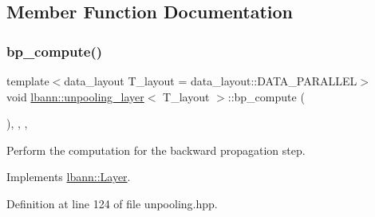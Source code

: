 \subsection{Member Function Documentation}
\mbox{\label{classlbann_1_1unpooling__layer_ad585e8ddaa34c221fa8e4d108c8950ae}} 
\subsubsection{\texorpdfstring{bp\+\_\+compute()}{bp\_compute()}}
{\footnotesize\ttfamily template$<$data\+\_\+layout T\+\_\+layout = data\+\_\+layout\+::\+D\+A\+T\+A\+\_\+\+P\+A\+R\+A\+L\+L\+EL$>$ \\
void \hyperlink{classlbann_1_1unpooling__layer}{lbann\+::unpooling\+\_\+layer}$<$ T\+\_\+layout $>$\+::bp\+\_\+compute (\begin{DoxyParamCaption}{ }\end{DoxyParamCaption})\hspace{0.3cm}{\ttfamily [inline]}, {\ttfamily [override]}, {\ttfamily [protected]}, {\ttfamily [virtual]}}

Perform the computation for the backward propagation step. 

Implements \hyperlink{classlbann_1_1Layer_a7442e01f9ee1294df2de811efcf5171e}{lbann\+::\+Layer}.



Definition at line 124 of file unpooling.\+hpp.


